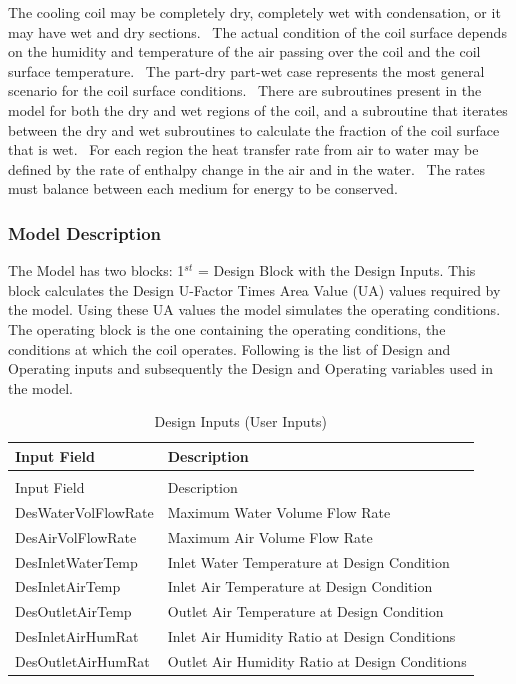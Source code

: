 The cooling coil may be completely dry, completely wet with condensation, or it may have wet and dry sections.~ The actual condition of the coil surface depends on the humidity and temperature of the air passing over the coil and the coil surface temperature.~ The part-dry part-wet case represents the most general scenario for the coil surface conditions.~ There are subroutines present in the model for both the dry and wet regions of the coil, and a subroutine that iterates between the dry and wet subroutines to calculate the fraction of the coil surface that is wet.~ For each region the heat transfer rate from air to water may be defined by the rate of enthalpy change in the air and in the water.~ The rates must balance between each medium for energy to be conserved.

\subsubsection{Model Description}\label{model-description-007}

The Model has two blocks: 1\(^{st}\) = Design Block with the Design Inputs. This block calculates the Design U-Factor Times Area Value (UA) values required by the model. Using these UA values the model simulates the operating conditions.~ The operating block is the one containing the operating conditions, the conditions at which the coil operates. Following is the list of Design and Operating inputs and subsequently the Design and Operating variables used in the model.

\begin{longtable}[c]{p{1.79in}p{4.2in}}
\caption{Design Inputs (User Inputs) \label{table:design-inputs-user-inputs}} \tabularnewline
\toprule
Input Field & Description \tabularnewline
\midrule
\endfirsthead

\caption[]{Design Inputs (User Inputs)} \tabularnewline
\toprule
Input Field & Description \tabularnewline
\midrule
\endhead

DesWaterVolFlowRate & Maximum Water Volume Flow Rate \tabularnewline
DesAirVolFlowRate & Maximum Air Volume Flow Rate \tabularnewline
DesInletWaterTemp & Inlet Water Temperature at Design Condition \tabularnewline
DesInletAirTemp & Inlet Air Temperature at Design Condition \tabularnewline
DesOutletAirTemp & Outlet Air Temperature at Design Condition \tabularnewline
DesInletAirHumRat & Inlet Air Humidity Ratio at Design Conditions \tabularnewline
DesOutletAirHumRat & Outlet Air Humidity Ratio at Design Conditions \tabularnewline
\bottomrule
\end{longtable}

